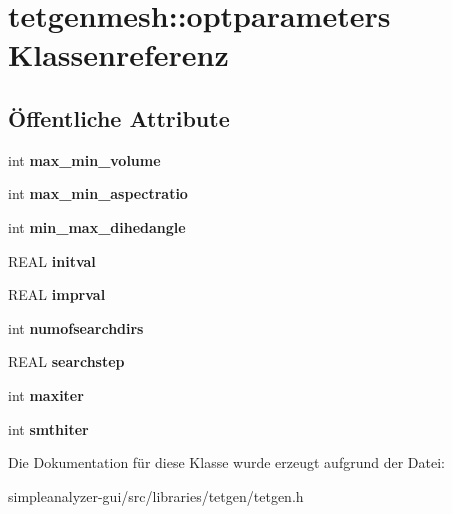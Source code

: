 \hypertarget{classtetgenmesh_1_1optparameters}{\section{tetgenmesh\-:\-:optparameters Klassenreferenz}
\label{classtetgenmesh_1_1optparameters}
}
\subsection*{Öffentliche Attribute}
\begin{DoxyCompactItemize}
\item 
\hypertarget{classtetgenmesh_1_1optparameters_ac9adc44bb0076f3b2e5c11c0bf831278}{int {\bfseries max\-\_\-min\-\_\-volume}}\label{classtetgenmesh_1_1optparameters_ac9adc44bb0076f3b2e5c11c0bf831278}

\item 
\hypertarget{classtetgenmesh_1_1optparameters_a844aa0c436ff6021d3c1f7132584faa6}{int {\bfseries max\-\_\-min\-\_\-aspectratio}}\label{classtetgenmesh_1_1optparameters_a844aa0c436ff6021d3c1f7132584faa6}

\item 
\hypertarget{classtetgenmesh_1_1optparameters_ab391511f633b84180d0e6cc52510e343}{int {\bfseries min\-\_\-max\-\_\-dihedangle}}\label{classtetgenmesh_1_1optparameters_ab391511f633b84180d0e6cc52510e343}

\item 
\hypertarget{classtetgenmesh_1_1optparameters_a06ad962f12e69b344f409f6e835d27ec}{R\-E\-A\-L {\bfseries initval}}\label{classtetgenmesh_1_1optparameters_a06ad962f12e69b344f409f6e835d27ec}

\item 
\hypertarget{classtetgenmesh_1_1optparameters_a5415643a8bf717ea781e97d56d725173}{R\-E\-A\-L {\bfseries imprval}}\label{classtetgenmesh_1_1optparameters_a5415643a8bf717ea781e97d56d725173}

\item 
\hypertarget{classtetgenmesh_1_1optparameters_af6ea36aeb4f65aa694e3df5c6dcd3a8d}{int {\bfseries numofsearchdirs}}\label{classtetgenmesh_1_1optparameters_af6ea36aeb4f65aa694e3df5c6dcd3a8d}

\item 
\hypertarget{classtetgenmesh_1_1optparameters_ace9dd689b3cb7b135573b46fbf6afed2}{R\-E\-A\-L {\bfseries searchstep}}\label{classtetgenmesh_1_1optparameters_ace9dd689b3cb7b135573b46fbf6afed2}

\item 
\hypertarget{classtetgenmesh_1_1optparameters_a0f2b3bd97f2120bdb77acb9e89026196}{int {\bfseries maxiter}}\label{classtetgenmesh_1_1optparameters_a0f2b3bd97f2120bdb77acb9e89026196}

\item 
\hypertarget{classtetgenmesh_1_1optparameters_a7c01e6bed6c1f6188f7408f84b9644d9}{int {\bfseries smthiter}}\label{classtetgenmesh_1_1optparameters_a7c01e6bed6c1f6188f7408f84b9644d9}

\end{DoxyCompactItemize}


Die Dokumentation für diese Klasse wurde erzeugt aufgrund der Datei\-:\begin{DoxyCompactItemize}
\item 
simpleanalyzer-\/gui/src/libraries/tetgen/tetgen.\-h\end{DoxyCompactItemize}
